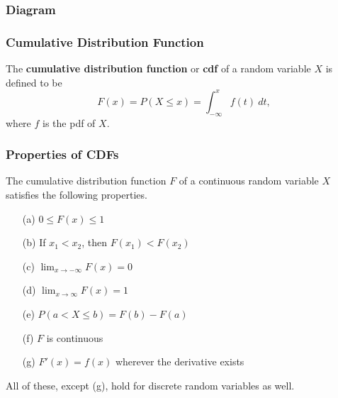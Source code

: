 \documentclass{beamer}
\begin{document}
\begin{frame}
\frametitle{Diagram}
\begin{center}
\end{center}
\end{frame}

\begin{frame}
\frametitle{Cumulative Distribution Function}
\begin{Definition}
The {\bf cumulative distribution function} or {\bf cdf} of a random variable $X$ is defined to be
$$
F(x) = P(X \leq x) = \int_{-\infty}^x f(t)\ dt,
$$
where $f$ is the pdf of $X$.
\end{Definition} 

\end{frame}

\begin{frame}
\frametitle{Properties of CDFs}
\small
The cumulative distribution function $F$ of a continuous random variable $X$ satisfies the following properties.
\begin{multicols}{2}
\begin{enumerate}
\item[(a)] $0 \leq F(x) \leq 1$
\item[(b)] If $x_1 < x_2$, then $F(x_1) < F(x_2)$
\item[(c)] $\displaystyle\lim_{x\to-\infty} F(x) = 0$
\item[(d)] $\displaystyle\lim_{x\to\infty} F(x) = 1$
\item[(e)] $P(a < X \leq b) = F(b) - F(a)$
\item[(f)] $F$ is continuous 
\item[(g)] $F'(x) = f(x)$ wherever the derivative exists
\end{enumerate}
\end{multicols}
All of these, except (g), hold for discrete random variables as well.
\end{frame}
\end{document}
